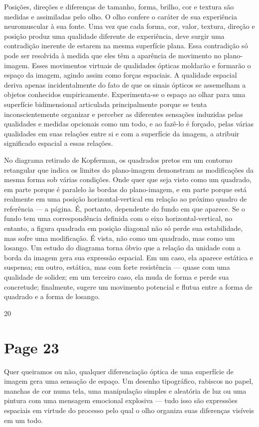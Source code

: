 \documentclass[a4paper]{article}
\begin{document}
Posições, direções e diferenças de tamanho, forma, brilho, cor e textura são medidas e assimiladas pelo olho. O olho confere o caráter de sua experiência neuromuscular à sua fonte. Uma vez que cada forma, cor, valor, textura, direção e posição produz uma qualidade diferente de experiência, deve surgir uma contradição inerente de estarem na mesma superfície plana. Essa contradição só pode ser resolvida à medida que eles têm a aparência de movimento no plano-imagem. Esses movimentos virtuais de qualidades ópticas moldarão e formarão o espaço da imagem, agindo assim como forças espaciais. A qualidade espacial deriva apenas incidentalmente do fato de que os sinais ópticos se assemelham a objetos conhecidos empiricamente. Experimenta-se o espaço ao olhar para uma superfície bidimensional articulada principalmente porque se tenta inconscientemente organizar e perceber as diferentes sensações induzidas pelas qualidades e medidas opcionais como um todo, e ao fazê-lo é forçado, pelas várias qualidades em suas relações entre si e com a superfície da imagem, a atribuir significado espacial a essas relações.

No diagrama retirado de Kopferman, os quadrados pretos em um contorno retangular que indica os limites do plano-imagem demonstram as modificações da mesma forma sob várias condições. Onde quer que seja visto como um quadrado, em parte porque é paralelo às bordas do plano-imagem, e em parte porque está realmente em uma posição horizontal-vertical em relação ao próximo quadro de referência --- a página. É, portanto, dependente do fundo em que aparece. Se o fundo tem uma correspondência definida com o eixo horizontal-vertical, no entanto, a figura quadrada em posição diagonal não só perde sua estabilidade, mas sofre uma modificação. É vista, não como um quadrado, mas como um losango. Um estudo do diagrama torna óbvio que a relação da unidade com a borda da imagem gera sua expressão espacial. Em um caso, ela aparece estática e suspensa; em outro, estática, mas com forte resistência --- quase com uma qualidade de solidez; em um terceiro caso, ela muda de forma e perde sua concretude; finalmente, sugere um movimento potencial e flutua entre a forma de quadrado e a forma de losango.

20

\newpage
\section*{Page 23}

Quer queiramos ou não, qualquer diferenciação óptica de uma superfície de imagem gera uma sensação de espaço. Um desenho tipográfico, rabiscos no papel, manchas de cor numa tela, uma manipulação simples e aleatória de luz ou uma pintura com uma mensagem emocional explosiva --- tudo isso são expressões espaciais em virtude do processo pelo qual o olho organiza suas diferenças visíveis em um todo.
\end{document}
